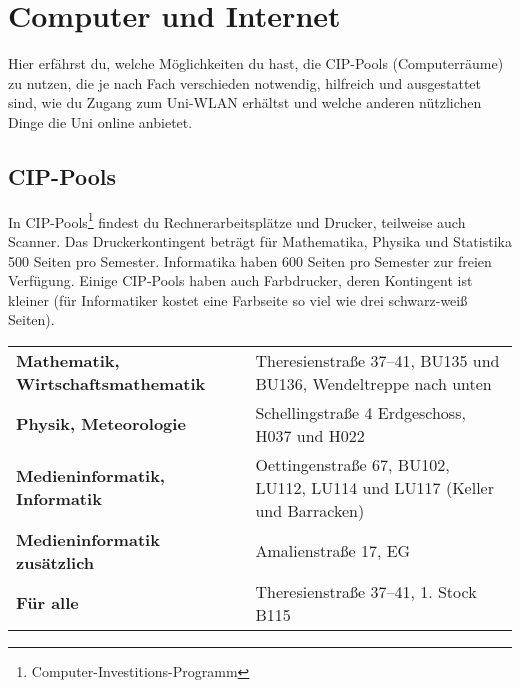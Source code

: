 
%
	
\chapter{Computer und Internet}
Hier erfährst du, welche Möglichkeiten du hast, die CIP-Pools (Computerräume) zu nutzen, die je nach Fach verschieden notwendig, hilfreich und ausgestattet sind, wie du Zugang zum Uni-WLAN erhältst 
und welche anderen nützlichen Dinge die Uni online anbietet.

\section{CIP-Pools}
In CIP-Pools\footnote{Computer-Investitions-Programm} findest du Rechnerarbeitsplätze und Drucker, teilweise auch Scanner. Das Druckerkontingent beträgt für Mathematika, Physika und Statistika 500 Seiten pro Semester. Informatika haben 600 Seiten pro Semester zur freien Verfügung. Einige CIP-Pools haben auch Farbdrucker, deren Kontingent ist kleiner (für Informatiker kostet eine Farbseite so viel wie drei schwarz-weiß Seiten).

\begin{tabularx}{\linewidth}{lX}
\textbf{Mathematik, Wirtschaftsmathematik} %
& Theresienstraße 37--41, BU135 und BU136, Wendeltreppe nach unten\\
\textbf{Physik, Meteorologie} %
& Schellingstraße 4 Erdgeschoss, H037 und H022\\
\textbf{Medieninformatik, Informatik}  %
& Oettingenstraße 67, BU102, LU112, LU114 und LU117 (Keller und Barracken)\\
\textbf{Medieninformatik zusätzlich} %
& Amalienstraße 17, EG\\
\textbf{Für alle}    %
& Theresienstraße 37--41, 1. Stock B115 \newline
\end{tabularx}


